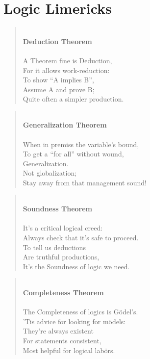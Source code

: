 \documentclass[12pt]{amsbook}
\theoremstyle{plain}
\theoremstyle{definition}
\theoremstyle{remark}
\newenvironment{poem}[1]%
{\begin{verse} \mbox{}\\ {\bf #1}\\ \mbox{}\\}%
{\end{verse}}
\begin{document}
%
%

\chapter{Logic Limericks} \label{ap:lim} 


\begin{poem}{Deduction Theorem} 
A Theorem fine is Deduction,\\
For it allows work-reduction:\\
To show ``A implies B'',\\
Assume A and prove B;\\
Quite often a simpler production.
\end{poem}

\begin{poem}{Generalization Theorem} 
When in premiss the variable's bound,\\
To get a ``for all'' without wound,\\
Generalization.\\
Not globalization;\\
Stay away from that management sound!
\end{poem}

\begin{poem}{Soundness Theorem} 
It's a critical logical creed:\\
Always check that it's safe to proceed. \\
To tell us deductions \\
Are truthful productions, \\
It's the Soundness of logic we need.
\end{poem}

\begin{poem}{Completeness Theorem} 
The Completeness of logics is G\"odel's. \\
'Tis advice for looking for m\"odels: \\
They're always existent \\
For statements consistent, \\
Most helpful for logical lab\"ors.
\end{poem}


\backmatter


%
%
\end{document}
